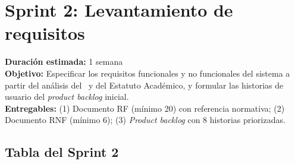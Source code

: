 \section*{Sprint 2: Levantamiento de requisitos}
\label{sprint:2}

\begin{tcolorbox}[sprintBox, title={Sprint 2 — Levantamiento de requisitos}]
  \textbf{Duración estimada:} 1 semana\\
  \textbf{Objetivo:} Especificar los requisitos funcionales y no funcionales
  del sistema a partir del análisis del \acuerdo\ y del Estatuto Académico,
  y formular las historias de usuario del \textit{product backlog} inicial.\\
  \textbf{Entregables:} (1) Documento RF (mínimo 20) con referencia normativa;
  (2) Documento RNF (mínimo 6); (3) \textit{Product backlog} con 8 historias
  priorizadas.
\end{tcolorbox}

\bigskip

\subsection*{Tabla del Sprint 2}

